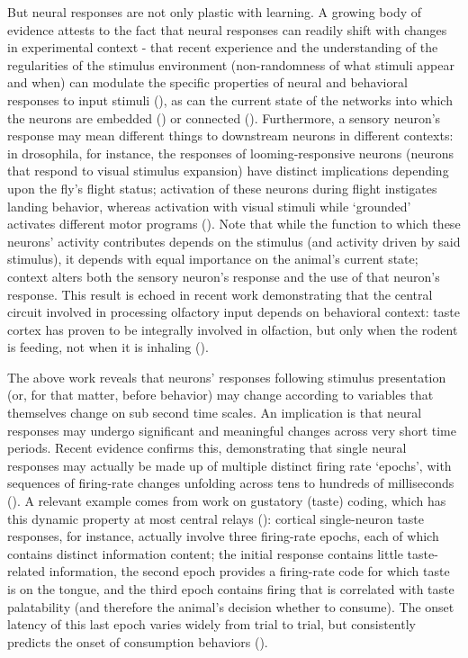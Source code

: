 \begin{refsection}
But neural responses are not only plastic with learning. A growing body of evidence attests to the fact that neural responses can readily shift with changes in experimental context - that recent experience and the understanding of the regularities of the stimulus environment (non-randomness of what stimuli appear and when) can modulate the specific properties of neural and behavioral responses to input stimuli (\cite{flores2018a,noudoost2017a}), as can the current state of the networks into which the neurons are embedded (\cite{sakata2016a}) or connected (\cite{mante2013a,safaai2015a}). Furthermore, a sensory neuron’s response may mean different things to downstream neurons in different contexts: in drosophila, for instance, the responses of looming-responsive neurons (neurons that respond to visual stimulus expansion) have distinct implications depending upon the fly’s flight status; activation of these neurons during flight instigates landing behavior, whereas activation with visual stimuli while ‘grounded’ activates different motor programs (\cite{ache2019a}). Note that while the function to which these neurons’ activity contributes depends on the stimulus (and activity driven by said stimulus), it depends with equal importance on the animal’s current state; context alters both the sensory neuron’s response and the use of that neuron’s response. This result is echoed in recent work demonstrating that the central circuit involved in processing olfactory input depends on behavioral context: taste cortex has proven to be integrally involved in olfaction, but only when the rodent is feeding, not when it is inhaling (\cite{blankenship2019a}).

The above work reveals that neurons’ responses following stimulus presentation (or, for that matter, before behavior) may change according to variables that themselves change on sub second time scales. An implication is that neural responses may undergo significant and meaningful changes across very short time periods. Recent evidence confirms this, demonstrating that single neural responses may actually be made up of multiple distinct firing rate ‘epochs’, with sequences of firing-rate changes unfolding across tens to hundreds of milliseconds (\cite{guo2015a,sauerbrei2020a,sugase1999a}). A relevant example comes from work on gustatory (taste) coding, which has this dynamic property at most central relays (\cite{baez-santiago2016a,fontanini2008a,li2016a,li2013a}): cortical single-neuron taste responses, for instance, actually involve three firing-rate epochs, each of which contains distinct information content; the initial response contains little taste-related information, the second epoch provides a firing-rate code for which taste is on the tongue, and the third epoch contains firing that is correlated with taste palatability (and therefore the animal’s decision whether to consume). The onset latency of this last epoch varies widely from trial to trial, but consistently predicts the onset of consumption behaviors (\cite{sadacca2012a}).


\end{refsection}
